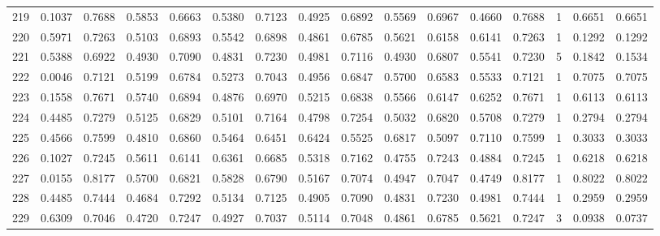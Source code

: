 \begin{tabular}{lrrrrrrrrrrrrrrr}
219 &      0.1037 &  0.7688 &  0.5853 &  0.6663 &  0.5380 &  0.7123 &  0.4925 &  0.6892 &  0.5569 &  0.6967 &   0.4660 &     0.7688 &      1 &                    0.6651 &                     0.6651 \\
220 &      0.5971 &  0.7263 &  0.5103 &  0.6893 &  0.5542 &  0.6898 &  0.4861 &  0.6785 &  0.5621 &  0.6158 &   0.6141 &     0.7263 &      1 &                    0.1292 &                     0.1292 \\
221 &      0.5388 &  0.6922 &  0.4930 &  0.7090 &  0.4831 &  0.7230 &  0.4981 &  0.7116 &  0.4930 &  0.6807 &   0.5541 &     0.7230 &      5 &                    0.1842 &                     0.1534 \\
222 &      0.0046 &  0.7121 &  0.5199 &  0.6784 &  0.5273 &  0.7043 &  0.4956 &  0.6847 &  0.5700 &  0.6583 &   0.5533 &     0.7121 &      1 &                    0.7075 &                     0.7075 \\
223 &      0.1558 &  0.7671 &  0.5740 &  0.6894 &  0.4876 &  0.6970 &  0.5215 &  0.6838 &  0.5566 &  0.6147 &   0.6252 &     0.7671 &      1 &                    0.6113 &                     0.6113 \\
224 &      0.4485 &  0.7279 &  0.5125 &  0.6829 &  0.5101 &  0.7164 &  0.4798 &  0.7254 &  0.5032 &  0.6820 &   0.5708 &     0.7279 &      1 &                    0.2794 &                     0.2794 \\
225 &      0.4566 &  0.7599 &  0.4810 &  0.6860 &  0.5464 &  0.6451 &  0.6424 &  0.5525 &  0.6817 &  0.5097 &   0.7110 &     0.7599 &      1 &                    0.3033 &                     0.3033 \\
226 &      0.1027 &  0.7245 &  0.5611 &  0.6141 &  0.6361 &  0.6685 &  0.5318 &  0.7162 &  0.4755 &  0.7243 &   0.4884 &     0.7245 &      1 &                    0.6218 &                     0.6218 \\
227 &      0.0155 &  0.8177 &  0.5700 &  0.6821 &  0.5828 &  0.6790 &  0.5167 &  0.7074 &  0.4947 &  0.7047 &   0.4749 &     0.8177 &      1 &                    0.8022 &                     0.8022 \\
228 &      0.4485 &  0.7444 &  0.4684 &  0.7292 &  0.5134 &  0.7125 &  0.4905 &  0.7090 &  0.4831 &  0.7230 &   0.4981 &     0.7444 &      1 &                    0.2959 &                     0.2959 \\
229 &      0.6309 &  0.7046 &  0.4720 &  0.7247 &  0.4927 &  0.7037 &  0.5114 &  0.7048 &  0.4861 &  0.6785 &   0.5621 &     0.7247 &      3 &                    0.0938 &                     0.0737 \\

\end{tabular}

